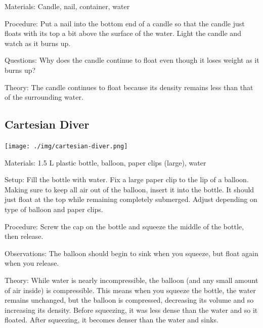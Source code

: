 \begin{multicols}{2}
\begin{description*}
\item[Materials:]{Candle, nail, container, water}
\item[Procedure:]{Put a nail into the bottom end of a candle so that the candle just floats with its top a bit above the surface of the water. Light the candle and watch as it burns up.}
\item[Questions:]{Why does the candle continue to float even though it loses weight as it burns up?}
\item[Theory:]{The candle continues to float because its density remains less than that of the surrounding water.}
\end{description*}

\vfill

\subsection{Cartesian Diver}

\begin{center}
\texttt{[image: ./img/cartesian-diver.png]}
\end{center}

\begin{description*}
\item[Materials:]{1.5 L plastic bottle, balloon, paper clips (large), water}
\item[Setup:]{Fill the bottle with water. Fix a large paper clip to the lip of a balloon. Making sure to keep all air out of the balloon, insert it into the bottle. It should just float at the top while remaining completely submerged. Adjust depending on type of balloon and paper clips.}
\item[Procedure:]{Screw the cap on the bottle and squeeze the middle of the bottle, then release.}
\item[Observations:]{The balloon should begin to sink when you squeeze, but float again when you release.}
\item[Theory:]{While water is nearly incompressible, the balloon (and any small amount of air inside) is compressible. This means when you squeeze the bottle, the water remains unchanged, but the balloon is compressed, decreasing its volume and so increasing its density. Before squeezing, it was less dense than the water and so it floated. After squeezing, it becomes denser than the water and sinks.}
\end{description*}


\end{multicols}
